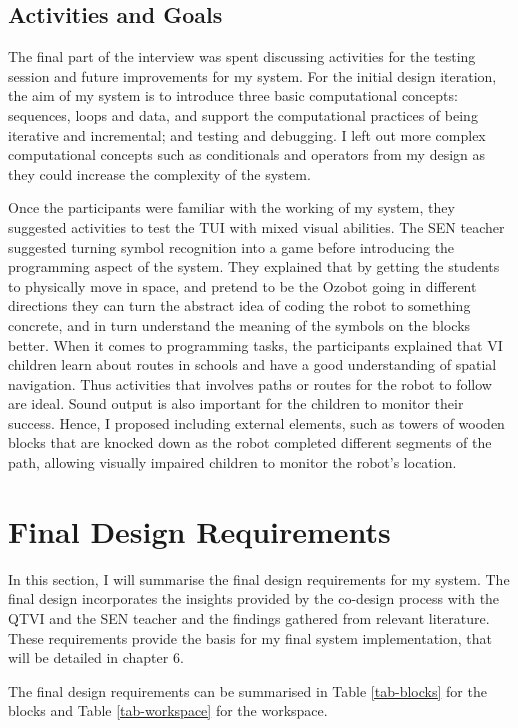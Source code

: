 \documentclass[oneside,%
                    author={Malak Hajji},
                    degree={BSc},
                    title={Designing An Accessible Computational Toolkit For Students},
                  subtitle={With Mixed Visual Abilities}]{dissertation}
\begin{document}
\subsection{Activities and Goals}
The final part of the interview was spent discussing activities for the testing session and future improvements for my system. For the initial design iteration, the aim of my system is to introduce three basic computational concepts: sequences, loops and data, and support the computational practices of being iterative and incremental; and testing and debugging. I left out more complex computational concepts such as conditionals and operators from my design as they could increase the complexity of the system. 

Once the participants were familiar with the working of my system, they suggested activities to test the TUI with mixed visual abilities. The SEN teacher suggested turning symbol recognition into a game before introducing the programming aspect of the system. They explained that by getting the students to physically move in space, and pretend to be the Ozobot going in different directions they can turn the abstract idea of coding the robot to something concrete, and in turn understand the meaning of the symbols on the blocks better. When it comes to programming tasks, the participants explained that VI children learn about routes in schools and have a good understanding of spatial navigation. Thus activities that involves paths or routes for the robot to follow are ideal. Sound output is also important for the children to monitor their success. Hence, I proposed including external elements, such as towers of wooden blocks that are knocked down as the robot completed different segments of the path, allowing visually impaired children to monitor the robot's location.

\section{Final Design Requirements}
In this section, I will summarise the final design requirements for my system. The final design incorporates the insights provided by the co-design process with the QTVI and the SEN teacher and the findings gathered from relevant literature. These  requirements provide the basis for my final system implementation, that will be detailed in chapter 6.

The final design requirements can be summarised in Table \ref{tab-blocks} for the blocks and Table \ref{tab-workspace} for the workspace.
\end{document}
